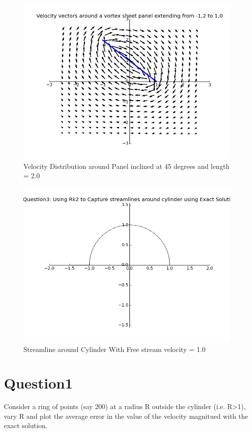 \documentclass{article}
\begin{document}
\begin{figure}[H] \label{figure}
\includegraphics[width=12cm]{panel.png}
\caption{Velocity Distribution around Panel inclined at 45 degrees and length = 2.0 }
\label{figure:}
\end{figure}

\begin{figure}[H] \label{figure}
\includegraphics[width=12cm]{streamline_exact.png}
\caption{Streamline around Cylinder With Free stream velocity = 1.0}
\label{figure:}
\end{figure}

\section*{Question1}
Consider a ring of points (say 200) at a radius R outside the cylinder (i.e. R>1), vary R and plot the average error in the value of the velocity magnitued with the exact solution.
\end{document}
